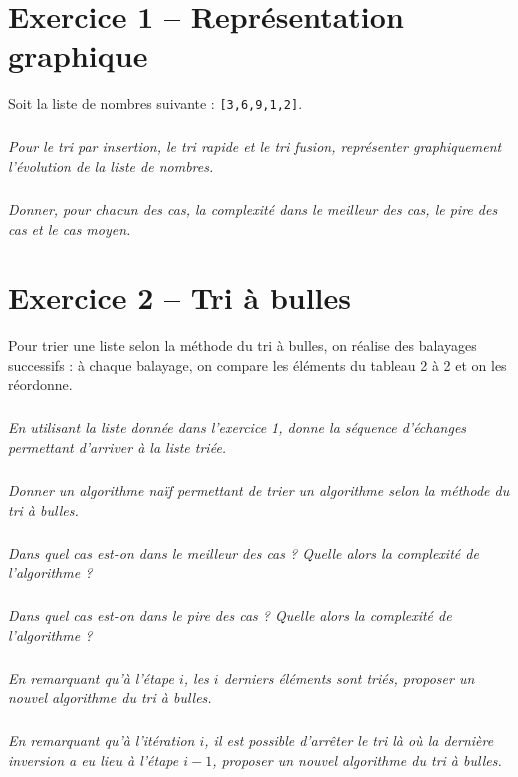 \documentclass[10pt,fleqn]{article} %
\begin{document}

\vspace{8cm}
\pagestyle{fancy}
\thispagestyle{plain}


\def\columnseprulecolor{\color{ocre}}
\setlength{\columnseprule}{0.4pt} 
\begin{multicols}{2}

\section*{Exercice 1 -- Représentation graphique}
Soit la liste de nombres suivante : \texttt{[3,6,9,1,2]}.

\subparagraph{}
\textit{Pour le tri par insertion, le tri rapide et le tri fusion, représenter graphiquement l'évolution de la liste de nombres.}

\subparagraph{}
\textit{Donner, pour chacun des cas, la complexité dans le meilleur des cas, le pire des cas et le cas moyen.}

\section*{Exercice 2 -- Tri à bulles}
Pour trier une liste selon la méthode du tri à bulles, on réalise des balayages successifs : à chaque balayage, on compare les éléments du tableau 2 à 2 et on les réordonne. 
\setcounter{exo}{0}

\subparagraph{}
\textit{En utilisant la liste donnée dans l'exercice 1, donne la séquence d'échanges permettant d'arriver à la liste triée.}

\subparagraph{}
\textit{Donner un algorithme naïf permettant de trier un algorithme selon la méthode du tri à bulles.}
\ifprof
\begin{corrige}
\end{corrige}
\else
\fi


\subparagraph{}
\textit{Dans quel cas est-on dans le meilleur des cas ? Quelle alors la complexité de l'algorithme ?}

\subparagraph{}
\textit{Dans quel cas est-on dans le pire des cas ? Quelle alors la complexité de l'algorithme ?}


\subparagraph{}
\textit{En remarquant qu'à l'étape $i$, les $i$ derniers éléments sont triés, proposer un nouvel algorithme du tri à bulles.}

\subparagraph{}
\textit{En remarquant qu'à l'itération $i$, il est possible d'arrêter le tri là où la dernière inversion a eu lieu à l'étape $i-1$, proposer un nouvel algorithme du tri à bulles.}


\end{multicols}
\end{document}
